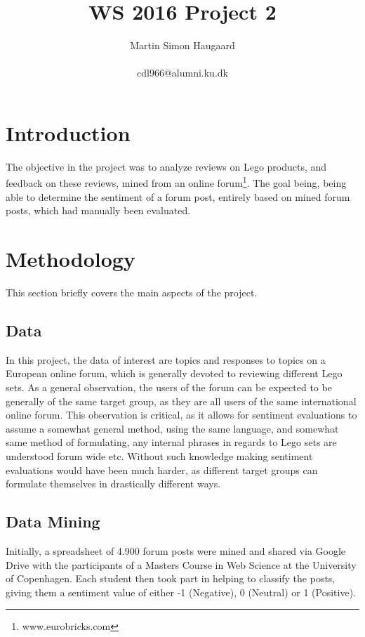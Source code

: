 \documentclass{sig-alternate}
\begin{document}
\crdata{}

\title{WS 2016 Project 2}
\author{
\alignauthor 
Martin Simon Haugaard\\~\\cdl966@alumni.ku.dk
}
\maketitle


\section{Introduction}
The objective in the project was to analyze reviews on Lego products, and feedback on these reviews, mined from an online forum\footnote{www.eurobricks.com}.
The goal being, being able to determine the sentiment of a forum post, entirely based on mined forum posts, which had manually been evaluated.
\section{Methodology}
This section briefly covers the main aspects of the project.
\subsection{Data}
In this project, the data of interest are topics and responses to topics on a European online forum, which is generally devoted to reviewing different Lego sets. As a general observation, the users of the forum can be expected to be generally of the same target group, as they are all users of the same international online forum. This observation is critical, as it allows for sentiment evaluations to assume a somewhat general method, using the same language, and somewhat same method of formulating, any internal phrases in regards to Lego sets are understood forum wide etc. Without such knowledge making sentiment evaluations would have been much harder, as different target groups can formulate themselves in drastically different ways.
\subsection{Data Mining}
Initially, a spreadsheet of 4.900 forum posts were mined and shared via Google Drive with the participants of a Masters Course in Web Science at the University of Copenhagen. Each student then took part in helping to classify the posts, giving them a sentiment value of either -1 (Negative), 0 (Neutral) or 1 (Positive).
\end{document}
